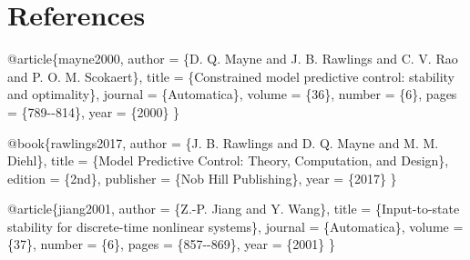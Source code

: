 \documentclass[
  11pt,
]{article}
\newenvironment{Shaded}{\begin{snugshade}}{\end{snugshade}}
\newcommand{\DataTypeTok}[1]{\textcolor[rgb]{0.68,0.00,0.00}{#1}}
\newcommand{\NormalTok}[1]{\textcolor[rgb]{0.00,0.23,0.31}{#1}}
\newcommand{\OtherTok}[1]{\textcolor[rgb]{0.00,0.23,0.31}{#1}}
\newcommand{\VariableTok}[1]{\textcolor[rgb]{0.07,0.07,0.07}{#1}}
\theoremstyle{plain}
\theoremstyle{plain}
\theoremstyle{definition}
\theoremstyle{remark}
\begin{document}
\section*{References}\label{references}

\protect{}\label{refs}

\begin{tcolorbox}[enhanced jigsaw, arc=.35mm, bottomrule=.15mm, bottomtitle=1mm, breakable, colback=white, colbacktitle=quarto-callout-note-color!10!white, colframe=quarto-callout-note-color-frame, coltitle=black, left=2mm, leftrule=.75mm, opacityback=0, opacitybacktitle=0.6, rightrule=.15mm, title=\textcolor{quarto-callout-note-color}{\faInfo}\hspace{0.5em}{Suggested bibliography entries (\texttt{refs.bib})}, titlerule=0mm, toprule=.15mm, toptitle=1mm]

\begin{Shaded}
\begin{Highlighting}[]
\VariableTok{@article}\NormalTok{\{}\OtherTok{mayne2000}\NormalTok{,}
  \DataTypeTok{author}\NormalTok{  = \{D. Q. Mayne and J. B. Rawlings and C. V. Rao and P. O. M. Scokaert\},}
  \DataTypeTok{title}\NormalTok{   = \{Constrained model predictive control: stability and optimality\},}
  \DataTypeTok{journal}\NormalTok{ = \{Automatica\},}
  \DataTypeTok{volume}\NormalTok{  = \{36\},}
  \DataTypeTok{number}\NormalTok{  = \{6\},}
  \DataTypeTok{pages}\NormalTok{   = \{789{-}{-}814\},}
  \DataTypeTok{year}\NormalTok{    = \{2000\}}
\NormalTok{\}}

\VariableTok{@book}\NormalTok{\{}\OtherTok{rawlings2017}\NormalTok{,}
  \DataTypeTok{author}\NormalTok{    = \{J. B. Rawlings and D. Q. Mayne and M. M. Diehl\},}
  \DataTypeTok{title}\NormalTok{     = \{Model Predictive Control: Theory, Computation, and Design\},}
  \DataTypeTok{edition}\NormalTok{   = \{2nd\},}
  \DataTypeTok{publisher}\NormalTok{ = \{Nob Hill Publishing\},}
  \DataTypeTok{year}\NormalTok{      = \{2017\}}
\NormalTok{\}}

\VariableTok{@article}\NormalTok{\{}\OtherTok{jiang2001}\NormalTok{,}
  \DataTypeTok{author}\NormalTok{  = \{Z.{-}P. Jiang and Y. Wang\},}
  \DataTypeTok{title}\NormalTok{   = \{Input{-}to{-}state stability for discrete{-}time nonlinear systems\},}
  \DataTypeTok{journal}\NormalTok{ = \{Automatica\},}
  \DataTypeTok{volume}\NormalTok{  = \{37\},}
  \DataTypeTok{number}\NormalTok{  = \{6\},}
  \DataTypeTok{pages}\NormalTok{   = \{857{-}{-}869\},}
  \DataTypeTok{year}\NormalTok{    = \{2001\}}
\NormalTok{\}}


\end{Highlighting}
\end{Shaded}
\end{tcolorbox}
\end{document}
